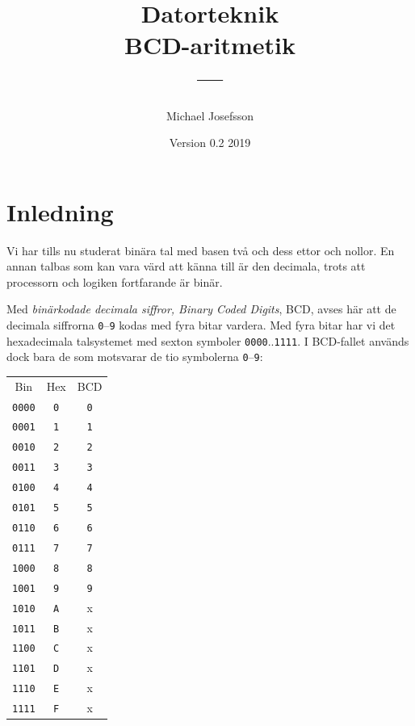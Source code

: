 \documentclass[oneside,10pt,a4paper,swedish]{scrbook}
\newcommand{\asm}[1]{\texttt{#1}}
\begin{document}
\title{Datorteknik\\{}BCD-aritmetik\\{}---}

\author{Michael Josefsson}
\date{Version 0.2 2019}

\maketitle
\tableofcontents
\setcounter{chapter}{0}

\chapter{Inledning} Vi har tills nu studerat binära tal med basen två och dess ettor och nollor. En annan talbas som kan vara värd att känna till är den decimala, trots att processorn och logiken fortfarande är binär. 

Med \emph{binärkodade decimala siffror, Binary Coded Digits}, BCD, avses här att de decimala siffrorna \asm{0}--\asm{9} kodas med fyra bitar vardera. Med fyra bitar har vi det hexadecimala talsystemet med sexton symboler \asm{0000}..\asm{1111}. I BCD-fallet används dock bara de som motsvarar de tio symbolerna  \asm{0}--\asm{9}:

\begin{center}
\begin{tabular}{ccc}
Bin & Hex & BCD \\
\asm{0000} & \asm{0} & \asm{0}\\
\asm{0001} & \asm{1} & \asm{1}\\
\asm{0010} & \asm{2} & \asm{2}\\
\asm{0011} & \asm{3} & \asm{3}\\
\asm{0100} & \asm{4} & \asm{4}\\
\asm{0101} & \asm{5} & \asm{5}\\
\asm{0110} & \asm{6} & \asm{6}\\
\asm{0111} & \asm{7} & \asm{7}\\
\asm{1000} & \asm{8} & \asm{8}\\
\asm{1001} & \asm{9} & \asm{9}\\
\asm{1010} & \asm{A} & x\\
\asm{1011} & \asm{B} & x\\
\asm{1100} & \asm{C} & x\\
\asm{1101} & \asm{D} & x\\
\asm{1110} & \asm{E} & x\\
\asm{1111} & \asm{F} & x\\
\end{tabular}
\end{center}
\end{document}
